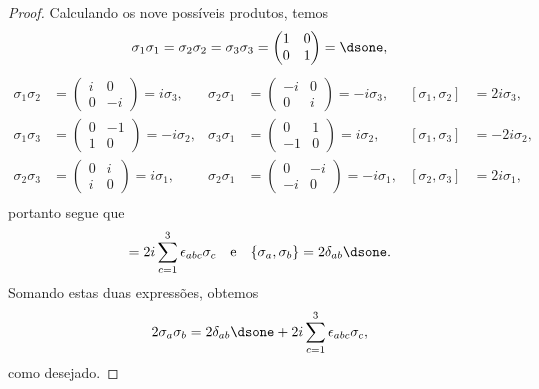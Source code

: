 \begin{proof}
    Calculando os nove possíveis produtos, temos
    \begin{equation*}
        \sigma_1 \sigma_1 = \sigma_2 \sigma_2 = \sigma_3 \sigma_3 = \begin{pmatrix}
            1&0\\0&1
        \end{pmatrix} = \dsone,
    \end{equation*}
    \begin{align*}
        \sigma_1 \sigma_2 &= \begin{pmatrix}
            i&0\\0&-i
        \end{pmatrix} = i \sigma_3,&
        \sigma_2 \sigma_1 &= \begin{pmatrix}
            -i&0\\0&i
        \end{pmatrix} = -i \sigma_3,&
            [\sigma_1, \sigma_2] &= 2i \sigma_3,\\
        \sigma_1 \sigma_3 &= \begin{pmatrix}
            0&-1\\1&0
        \end{pmatrix} = -i \sigma_2,&
        \sigma_3 \sigma_1 &= \begin{pmatrix}
            0&1\\-1&0
        \end{pmatrix} = i \sigma_2,&
            [\sigma_1, \sigma_3] &= -2i \sigma_2,\\
        \sigma_2 \sigma_3 &= \begin{pmatrix}
            0&i\\i&0
        \end{pmatrix} = i \sigma_1,&
        \sigma_2 \sigma_1 &= \begin{pmatrix}
            0&-i\\-i&0
        \end{pmatrix} = -i \sigma_1,&
            [\sigma_2, \sigma_3] &= 2i \sigma_1,\\
    \end{align*}
    portanto segue que
    \begin{equation*}
        [\sigma_a, \sigma_b] = 2i \sum_{c=1}^3 \epsilon_{abc}\sigma_c\quad\text{e}\quad\{\sigma_a, \sigma_b\} = 2 \delta_{ab} \dsone.
    \end{equation*}
    Somando estas duas expressões, obtemos
    \begin{equation*}
        2\sigma_a \sigma_b = 2 \delta_{ab} \dsone + 2i\sum_{c = 1}^3 \epsilon_{abc}\sigma_c,
    \end{equation*}
    como desejado.
\end{proof}

